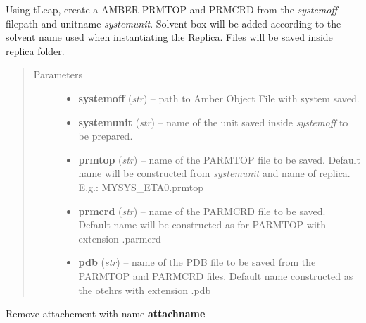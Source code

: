 \documentclass[letterpaper,10pt,english]{sphinxmanual}
\begin{document}
\begin{fulllineitems}
\begin{fulllineitems}
\label{replicas:pyMDMix.Replicas.Replica.createSystemFromOFF}
Using tLeap, create a AMBER PRMTOP and PRMCRD from the \emph{systemoff} filepath and unitname \emph{systemunit}.
Solvent box will be added according to the solvent name used when instantiating the Replica.
Files will be saved inside replica folder.
\begin{quote}\begin{description}
\item[{Parameters}] \leavevmode\begin{itemize}
\item {} 
\textbf{systemoff} (\emph{str}) -- path to Amber Object File with system saved.

\item {} 
\textbf{systemunit} (\emph{str}) -- name of the unit saved inside \emph{systemoff} to be prepared.

\item {} 
\textbf{prmtop} (\emph{str}) -- name of the PARMTOP file to be saved. Default name will be constructed from \emph{systemunit} and name of replica. E.g.: MYSYS\_ETA0.prmtop

\item {} 
\textbf{prmcrd} (\emph{str}) -- name of the PARMCRD file to be saved. Default name will be constructed as for PARMTOP with extension .parmcrd

\item {} 
\textbf{pdb} (\emph{str}) -- name of the PDB file to be saved from the PARMTOP and PARMCRD files. Default name constructed as the otehrs with extension .pdb

\end{itemize}

\end{description}\end{quote}

\end{fulllineitems}


\begin{fulllineitems}
\label{replicas:pyMDMix.Replicas.Replica.dettach}
Remove attachement with name \textbf{attachname}

\end{fulllineitems}


\end{fulllineitems}
\end{document}
